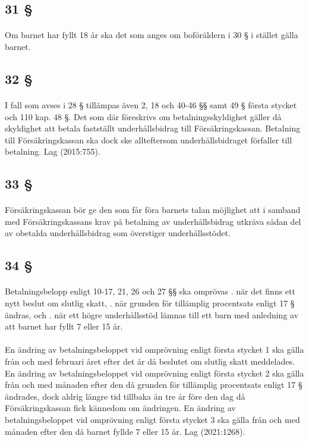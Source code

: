 \documentclass[a4paper,notitlepage,openany,10pt]{book}
\begin{document}
\subsection*{31 §}
\paragraph*{}
Om barnet har fyllt 18 år ska det som anges om boföräldern i 30 § i stället gälla barnet.
\subsection*{32 §}
\paragraph*{}
I fall som avses i 28 § tillämpas även 2, 18 och 40-46 §§ samt 49 § första stycket och 110 kap. 48 §. Det som där föreskrivs om betalningsskyldighet gäller då skyldighet att betala fastställt underhållsbidrag till Försäkringskassan. Betalning till Försäkringskassan ska dock ske allteftersom underhållsbidraget förfaller till betalning.
Lag (2015:755).
\subsection*{33 §}
\paragraph*{}
Försäkringskassan bör ge den som får föra barnets talan möjlighet att i samband med Försäkringskassans krav på betalning av underhållsbidrag utkräva sådan del av obetalda underhållsbidrag som överstiger underhållsstödet.
\subsection*{34 §}
\paragraph*{}
Betalningsbelopp enligt 10-17, 21, 26 och 27 §§ ska omprövas
. när det finns ett nytt beslut om slutlig skatt,
. när grunden för tillämplig procentsats enligt 17 § ändras, och
. när ett högre underhållsstöd lämnas till ett barn med anledning av att barnet har fyllt 7 eller 15 år.
\paragraph*{}
En ändring av betalningsbeloppet vid omprövning enligt första stycket 1 ska gälla från och med februari året efter det år då beslutet om slutlig skatt meddelades. En ändring av betalningsbeloppet vid omprövning enligt första stycket 2 ska gälla från och med månaden efter den då grunden för tillämplig procentsats enligt 17 § ändrades, dock aldrig längre tid tillbaka än tre år före den dag då Försäkringskassan fick kännedom om ändringen. En ändring av betalningsbeloppet vid omprövning enligt första stycket 3 ska gälla från och med månaden efter den då barnet fyllde 7 eller 15 år.
Lag (2021:1268).
\end{document}

